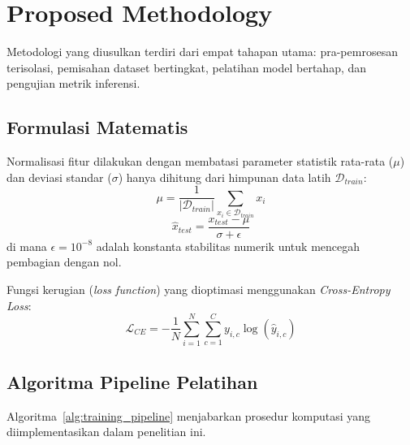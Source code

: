 ﻿\documentclass[journal,10pt,twocolumn]{article}
\begin{document}
\section{Proposed Methodology}
Metodologi yang diusulkan terdiri dari empat tahapan utama: pra-pemrosesan terisolasi, pemisahan dataset bertingkat, pelatihan model bertahap, dan pengujian metrik inferensi.

\subsection{Formulasi Matematis}
Normalisasi fitur dilakukan dengan membatasi parameter statistik rata-rata ($\mu$) dan deviasi standar ($\sigma$) hanya dihitung dari himpunan data latih $\mathcal{D}_{train}$:
\begin{equation}
    \mu = \frac{1}{|\mathcal{D}_{train}|} \sum_{x_i \in \mathcal{D}_{train}} x_i
\end{equation}
\begin{equation}
    \hat{x}_{test} = \frac{x_{test} - \mu}{\sigma + \epsilon}
\end{equation}
di mana $\epsilon = 10^{-8}$ adalah konstanta stabilitas numerik untuk mencegah pembagian dengan nol.

Fungsi kerugian (\textit{loss function}) yang dioptimasi menggunakan \textit{Cross-Entropy Loss}:
\begin{equation}
    \mathcal{L}_{CE} = -\frac{1}{N} \sum_{i=1}^{N} \sum_{c=1}^{C} y_{i,c} \log(\hat{y}_{i,c})
\end{equation}

\subsection{Algoritma Pipeline Pelatihan}
Algoritma~\ref{alg:training_pipeline} menjabarkan prosedur komputasi yang diimplementasikan dalam penelitian ini.
\end{document}
